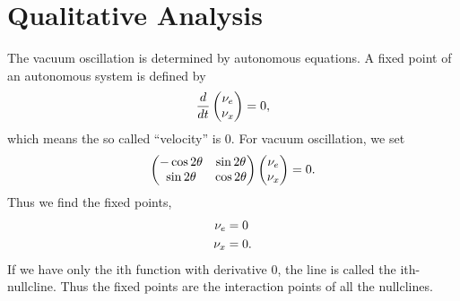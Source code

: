 \documentclass[letterpaper,12pt,english]{sphinxmanual}
\begin{document}
\section{Qualitative Analysis}
\label{math:qualitative-analysis}\label{math:index-0}
The vacuum oscillation is determined by autonomous equations. A fixed point of an autonomous system is defined by
\begin{gather}
\begin{split}\frac{d}{dt} \begin{pmatrix} \nu_e \\ \nu_x \end{pmatrix}=0,\end{split}\notag
\end{gather}
which means the so called ``velocity'' is 0. For vacuum oscillation, we set
\begin{gather}
\begin{split}\begin{pmatrix} - \cos 2\theta & \sin 2\theta \\  \sin 2\theta  & \cos 2\theta   \end{pmatrix} \begin{pmatrix} \nu_e \\ \nu_x \end{pmatrix} =0.\end{split}\notag
\end{gather}
Thus we find the fixed points,
\begin{gather}
\begin{split}\nu_e & = 0 \\
\nu_x & = 0.\end{split}\notag
\end{gather}
If we have only the ith function with derivative 0, the line is called the ith-nullcline. Thus the fixed points are the interaction points of all the nullclines.
\end{document}
